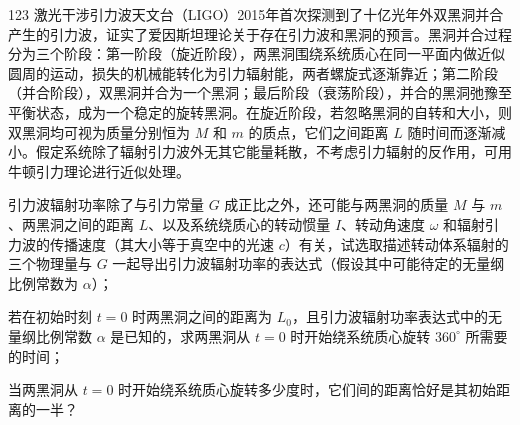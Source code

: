 \begin{problem}[2020第37届全国中学生物理竞赛复赛][双黑洞旋近引力波辐射]{123}
    激光干涉引力波天文台（LIGO）2015年首次探测到了十亿光年外双黑洞并合产生的引力波，证实了爱因斯坦理论关于存在引力波和黑洞的预言。黑洞并合过程分为三个阶段：第一阶段（旋近阶段），两黑洞围绕系统质心在同一平面内做近似圆周的运动，损失的机械能转化为引力辐射能，两者螺旋式逐渐靠近；第二阶段（并合阶段），双黑洞并合为一个黑洞；最后阶段（衰荡阶段），并合的黑洞弛豫至平衡状态，成为一个稳定的旋转黑洞。在旋近阶段，若忽略黑洞的自转和大小，则双黑洞均可视为质量分别恒为 $M$ 和 $m$ 的质点，它们之间距离 $L$ 随时间而逐渐减小。假定系统除了辐射引力波外无其它能量耗散，不考虑引力辐射的反作用，可用牛顿引力理论进行近似处理。
    \begin{subproblem}
        引力波辐射功率除了与引力常量 $G$ 成正比之外，还可能与两黑洞的质量 $M$ 与 $m$、两黑洞之间的距离 $L$、以及系统绕质心的转动惯量 $I$、转动角速度 $\omega$ 和辐射引力波的传播速度（其大小等于真空中的光速 $c$）有关，试选取描述转动体系辐射的三个物理量与 $G$ 一起导出引力波辐射功率的表达式（假设其中可能待定的无量纲比例常数为 $\alpha$）；
    \end{subproblem}
    \begin{subproblem}
        若在初始时刻 $t = 0$ 时两黑洞之间的距离为 $L_{0}$，且引力波辐射功率表达式中的无量纲比例常数 $\alpha$ 是已知的，求两黑洞从 $t = 0$ 时开始绕系统质心旋转 $360^{\circ}$ 所需要的时间；
    \end{subproblem}
    \begin{subproblem}
        当两黑洞从 $t = 0$ 时开始绕系统质心旋转多少度时，它们间的距离恰好是其初始距离的一半？
    \end{subproblem}
\end{problem}